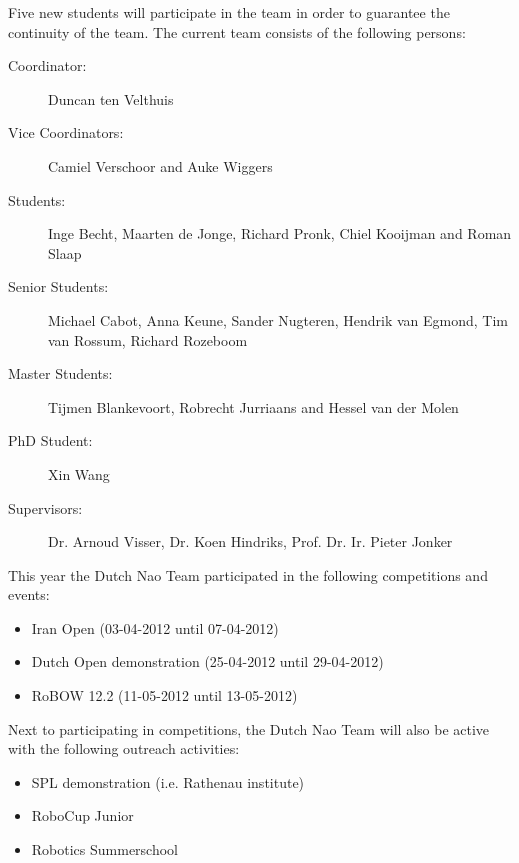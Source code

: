 \documentclass[11pt]{llncs}
\begin{document}
Five new students will participate in the team in order to guarantee the continuity of the team. 
The current team consists of the following persons:
\begin{description}

\item[Coordinator:] Duncan ten Velthuis
\item[Vice Coordinators:] Camiel Verschoor and Auke Wiggers
\item[Students:] Inge Becht, Maarten de Jonge, Richard Pronk, Chiel Kooijman and Roman Slaap
\item[Senior Students:] Michael Cabot, Anna Keune, Sander Nugteren, Hendrik van Egmond, Tim van Rossum, Richard Rozeboom
\item[Master Students:] Tijmen Blankevoort, Robrecht Jurriaans and Hessel van der Molen
\item[PhD Student:] Xin Wang
\item[Supervisors:] Dr. Arnoud Visser, Dr. Koen Hindriks, Prof. Dr. Ir. Pieter Jonker
\end{description}
This year the Dutch Nao Team participated in the following competitions and events:
\begin{itemize}
\item Iran Open (03-04-2012 until 07-04-2012)
\item Dutch Open demonstration (25-04-2012 until 29-04-2012)
\item RoBOW 12.2 (11-05-2012 until 13-05-2012)
\end{itemize}
Next to participating in competitions, the Dutch Nao Team will also be active with the following outreach activities:
\begin{itemize}
\item SPL demonstration (i.e. Rathenau institute)
\item RoboCup Junior 
\item Robotics Summerschool
\end{itemize}
\end{document}

